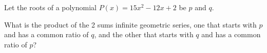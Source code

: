 Let the roots of a polynomial $P(x) = 15x^2 -12x +2$ be $p$ and $q$.



What is the product of the 2 sums infinite geometric series, one that starts with $p$ and has a common ratio of $q$, and the other that starts with $q$ and has a common ratio of $p$?
